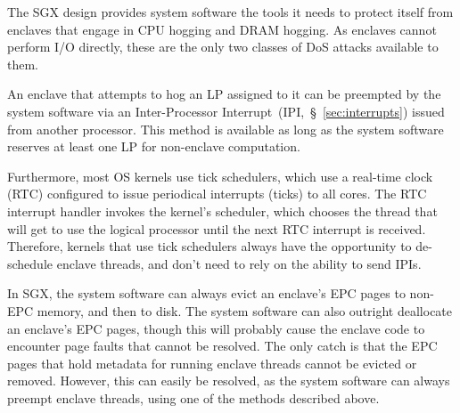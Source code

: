 The SGX design provides system software the tools it needs to protect itself
from enclaves that engage in CPU hogging and DRAM hogging. As enclaves cannot
perform I/O directly, these are the only two classes of DoS attacks available
to them.

An enclave that attempts to hog an LP assigned to it can be preempted by the
system software via an Inter-Processor Interrupt~(IPI,~\S~\ref{sec:interrupts})
issued from another processor. This method is available as long as the system
software reserves at least one LP for non-enclave computation.

Furthermore, most OS kernels use tick schedulers, which use a real-time clock
(RTC) configured to issue periodical interrupts (ticks) to all cores. The RTC
interrupt handler invokes the kernel's scheduler, which chooses the thread that
will get to use the logical processor until the next RTC interrupt is received.
Therefore, kernels that use tick schedulers always have the opportunity to
de-schedule enclave threads, and don't need to rely on the ability to send
IPIs.

In SGX, the system software can always evict an enclave's EPC pages to non-EPC
memory, and then to disk. The system software can also outright deallocate an
enclave's EPC pages, though this will probably cause the enclave code to
encounter page faults that cannot be resolved. The only catch is that the EPC
pages that hold metadata for running enclave threads cannot be evicted or
removed. However, this can easily be resolved, as the system software can
always preempt enclave threads, using one of the methods described above.

%



